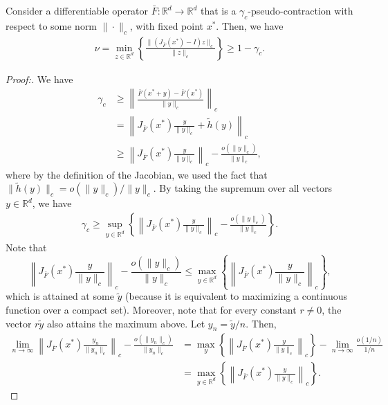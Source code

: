 \documentclass[10pt,a4paper]{amsart}
\begin{document}
\begin{lemma}\label{lem:nu_gammac}
    Consider a differentiable operator $\bar{F}:\mathbb{R}^d\rightarrow \mathbb{R}^d$ that is a $\gamma_c$-pseudo-contraction with respect to some norm $\|\cdot\|_c$, with fixed point $x^*$. Then, we have
    \begin{align*}
        \nu = \min_{z\in\mathbb{R}^d} \left\{ \frac{\|(J_{\bar{F}}(x^*)-I)z\|_c}{\|z\|_c} \right\} \geq 1-\gamma_c.
    \end{align*}
\end{lemma}

\begin{proof}[Proof:]
We have
\begin{align*}
    \gamma_c &\geq \left\| \frac{\bar{F}(x^*+y)-\bar{F}(x^*)}{\|y\|_c} \right\|_c \tag{Pseudo-contraction property} \\
    &= \left\| J_{\bar{F}}(x^*) \frac{y}{\|y\|_c} + \tilde{h}(y) \right\|_c  \tag{definition of Jacobian matrix} \\
    &\geq \left\| J_{\bar{F}}(x^*) \frac{y}{\|y\|_c} \right\|_c - \frac{o(\|y\|_c)}{\|y\|_c},\tag{triangle inequality}
\end{align*}
where by the definition of the Jacobian, we used the fact that  $\|\tilde{h}(y)\|_c = o(\|y\|_c)/\|y\|_c$. By taking the supremum over all vectors $y\in\mathbb{R}^d$, we have
\begin{align*}
    \gamma_c \geq \sup_{y\in\mathbb{R}^d} \left\{ \left\| J_{\bar{F}}(x^*) \frac{y}{\|y\|_c} \right\|_c - \frac{o(\|y\|_c)}{\|y\|_c} \right\}.
\end{align*}
Note that 
\[ \left\| J_{\bar{F}}(x^*) \frac{y}{\|y\|_c} \right\|_c - \frac{o(\|y\|_c)}{\|y\|_c}  \leq \max_{y\in\mathbb{R}^d} \left\{ \left\| J_{\bar{F}}(x^*) \frac{y}{\|y\|_c} \right\|_c \right\}, \]
which is attained at some $\tilde{y}$ (because it is equivalent to maximizing a continuous function over a compact set). Moreover, note that for every constant $r\neq 0$, the vector $r\tilde{y}$ also attains the maximum above. Let $y_n = \tilde{y}/n$. Then, 
\begin{align*}
    \lim\limits_{n\to\infty} \left\| J_{\bar{F}}(x^*) \frac{y_n}{\|y_n\|_c} \right\|_c - \frac{o(\|y_n\|_c)}{\|y_n\|_c} &= \max_y \left\{ \left\| J_{\bar{F}}(x^*) \frac{y}{\|y\|_c} \right\|_c \right\} - \lim\limits_{n\to\infty} \frac{o(1/n)}{1/n} \\
    &= \max_{y\in\mathbb{R}^d} \left\{ \left\| J_{\bar{F}}(x^*) \frac{y}{\|y\|_c} \right\|_c \right\}.
\end{align*}

\end{proof}
\end{document}
